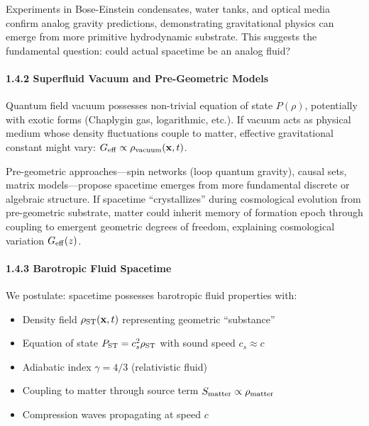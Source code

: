 \documentclass[11pt,a4paper]{article}
\providecommand{\tightlist}{\setlength{\itemsep}{0pt}\setlength{\parskip}{0pt}}
\begin{document}
Experiments in Bose-Einstein condensates, water tanks, and optical media
confirm analog gravity predictions, demonstrating gravitational physics
can emerge from more primitive hydrodynamic substrate. This suggests the
fundamental question: could actual spacetime be an analog fluid?

\hypertarget{superfluid-vacuum-and-pre-geometric-models}{%
\paragraph{1.4.2 Superfluid Vacuum and Pre-Geometric
Models}\label{superfluid-vacuum-and-pre-geometric-models}}

Quantum field vacuum possesses non-trivial equation of state
\(P(\rho)\), potentially with exotic forms (Chaplygin gas, logarithmic,
etc.). If vacuum acts as physical medium whose density fluctuations
couple to matter, effective gravitational constant might vary:
\(G_{\rm eff} \propto \rho_{\rm vacuum}({\bf x},t)\).

Pre-geometric approaches---spin networks (loop quantum gravity), causal
sets, matrix models---propose spacetime emerges from more fundamental
discrete or algebraic structure. If spacetime ``crystallizes'' during
cosmological evolution from pre-geometric substrate, matter could
inherit memory of formation epoch through coupling to emergent geometric
degrees of freedom, explaining cosmological variation
\(G_{\rm eff}(z)\).

\hypertarget{barotropic-fluid-spacetime}{%
\paragraph{1.4.3 Barotropic Fluid
Spacetime}\label{barotropic-fluid-spacetime}}

We postulate: spacetime possesses barotropic fluid properties with:

\begin{itemize}
\tightlist
\item
  Density field \(\rho_{\rm ST}({\bf x},t)\) representing geometric
  ``substance''
\item
  Equation of state \(P_{\rm ST} = c_s^2 \rho_{\rm ST}\) with sound
  speed \(c_s \approx c\)
\item
  Adiabatic index \(\gamma = 4/3\) (relativistic fluid)
\item
  Coupling to matter through source term
  \(S_{\rm matter} \propto \rho_{\rm matter}\)
\item
  Compression waves propagating at speed \(c\)
\end{itemize}
\end{document}
